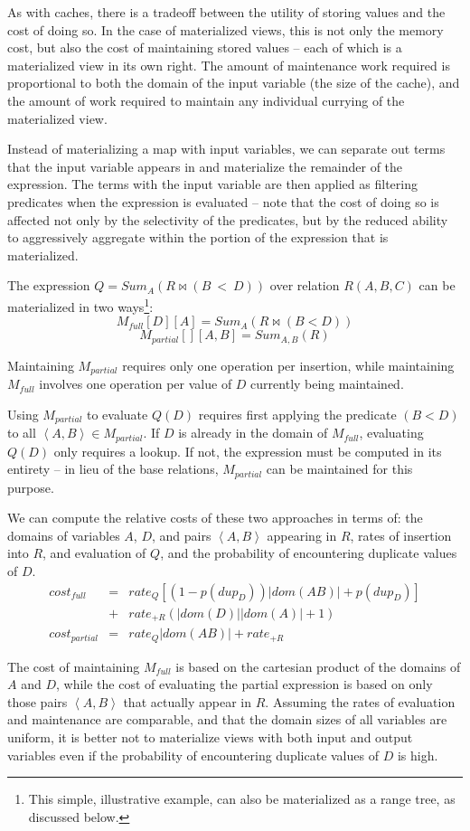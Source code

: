 As with caches, there is a tradeoff between the utility of storing values and the cost of doing so.  In the case of materialized views, this is not only the memory cost, but also the cost of maintaining stored values -- each of which is a materialized view in its own right.  The amount of maintenance work required is proportional to both the domain of the input variable (the size of the cache), and the amount of work required to maintain any individual currying of the materialized view.  

Instead of materializing a map with input variables, we can separate out terms that the input variable appears in and materialize the remainder of the expression.  The terms with the input variable are then applied as filtering predicates when the expression is evaluated -- note that the cost of doing so is  affected not only by the selectivity of the predicates, but by the reduced ability to aggressively aggregate within the portion of the expression that is materialized.

\begin{example}
The expression $Q = Sum_A(R \bowtie (B~<~D))$ over relation $R(A,B,C)$ can be materialized in two ways\footnote{This simple, illustrative example, can also be materialized as a range tree, as discussed below.}:
$$M_{full}[D][A] = Sum_A(R \bowtie (B < D))$$
$$M_{partial}[][A,B] = Sum_{A,B}(R)$$
\end{example}

Maintaining $M_{partial}$ requires only one operation per insertion, while maintaining $M_{full}$ involves one operation per value of $D$ currently being maintained.  

Using $M_{partial}$ to evaluate $Q(D)$ requires first applying the predicate $(B < D)$ to all $\left<A,B\right> \in M_{partial}$.  If $D$ is already in the domain of $M_{full}$, evaluating $Q(D)$ only requires a lookup.  If not, the expression must be computed in its entirety -- in lieu of the base relations, $M_{partial}$ can be maintained for this purpose.

We can compute the relative costs of these two approaches in terms of: the domains of variables $A$, $D$, and pairs $\left<A,B\right>$ appearing in $R$, rates of insertion into $R$, and evaluation of $Q$, and the probability of encountering duplicate values of $D$.
\begin{eqnarray*}
cost_{full} & = & rate_{Q} \left[(1-p(dup_D))|dom(AB)|+p(dup_D)\right] \\
 & + & rate_{+R} (|dom(D)||dom(A)| + 1)\\
cost_{partial} & = & rate_{Q} |dom(AB)| + rate_{+R}
\end{eqnarray*}

The cost of maintaining $M_{full}$ is based on the cartesian product of the domains of $A$ and $D$, while the cost of evaluating the partial expression is based on only those pairs $\left<A,B\right>$ that actually appear in $R$.  Assuming the rates of evaluation and maintenance are comparable, and that the domain sizes of all variables are uniform, it is better not to materialize views with both input and output variables even if the probability of encountering duplicate values of $D$ is high.

